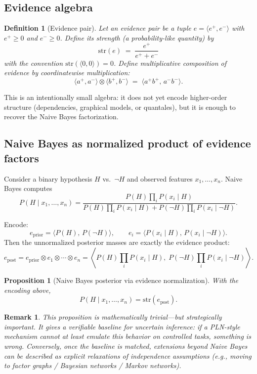 \documentclass[11pt]{article}
\newtheorem{definition}{Definition}
\newtheorem{proposition}{Proposition}
\newtheorem{remark}{Remark}
\begin{document}
\subsection{Evidence algebra}

\begin{definition}[Evidence pair]
Let an \emph{evidence pair} be a tuple $e=\langle e^{+}, e^{-}\rangle$ with $e^{+}\ge 0$ and $e^{-}\ge 0$.
Define its \emph{strength} (a probability-like quantity) by
\[
\mathrm{str}(e) \;=\; \frac{e^{+}}{e^{+}+e^{-}}
\]
with the convention $\mathrm{str}(\langle 0,0\rangle)=0$.
Define \emph{multiplicative composition} of evidence by coordinatewise multiplication:
\[
\langle a^{+},a^{-}\rangle \otimes \langle b^{+},b^{-}\rangle
\;=\;
\langle a^{+}b^{+},\,a^{-}b^{-}\rangle.
\]
\end{definition}

This is an intentionally small algebra: it does not yet encode higher-order structure (dependencies,
graphical models, or quantales), but it is enough to recover the Naive Bayes factorization.

\subsection{Naive Bayes as normalized product of evidence factors}

Consider a binary hypothesis $H$ vs.\ $\neg H$ and observed features $x_1,\ldots,x_n$.
Naive Bayes computes
\[
P(H\mid x_1,\ldots,x_n)=\frac{P(H)\prod_i P(x_i\mid H)}
{P(H)\prod_i P(x_i\mid H)+P(\neg H)\prod_i P(x_i\mid \neg H)}.
\]

Encode:
\[
e_{\mathrm{prior}}=\langle P(H),\,P(\neg H)\rangle,\qquad
e_i=\langle P(x_i\mid H),\,P(x_i\mid \neg H)\rangle.
\]
Then the unnormalized posterior masses are exactly the evidence product:
\[
e_{\mathrm{post}}
=
e_{\mathrm{prior}} \otimes e_1 \otimes \cdots \otimes e_n
=
\left\langle
P(H)\prod_i P(x_i\mid H),\;
P(\neg H)\prod_i P(x_i\mid \neg H)
\right\rangle.
\]

\begin{proposition}[Naive Bayes posterior via evidence normalization]
With the encoding above,
\[
P(H\mid x_1,\ldots,x_n)=\mathrm{str}(e_{\mathrm{post}}).
\]
\end{proposition}

\begin{remark}
This proposition is mathematically trivial---but strategically important.
It gives a \emph{verifiable baseline} for uncertain inference: if a PLN-style mechanism cannot at least
emulate this behavior on controlled tasks, something is wrong. Conversely, once the baseline is matched,
extensions beyond Naive Bayes can be described as explicit relaxations of independence assumptions
(e.g., moving to factor graphs / Bayesian networks / Markov networks).
\end{remark}
\end{document}
